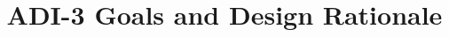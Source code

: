 \documentclass{article}
\begin{document}
\title{ADI-3 Goals and Design Rationale}
\author{}
\maketitle

%



%
%
\end{document}
